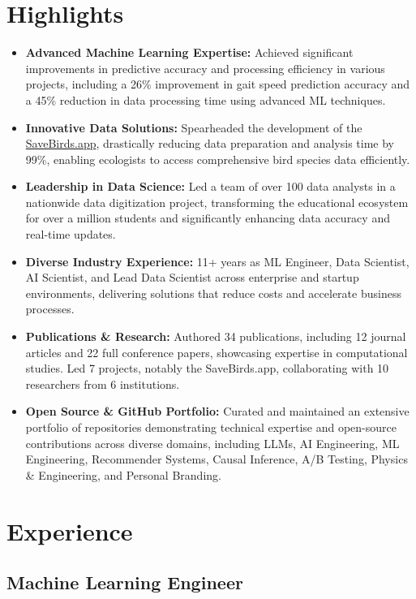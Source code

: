 \documentclass[11pt]{article}
\begin{document}
\section{Highlights}
\begin{itemize}[itemsep=5pt]
	\item \textbf{Advanced Machine Learning Expertise:} Achieved significant improvements in predictive accuracy and processing efficiency in various projects, including a 26\% improvement in gait speed prediction accuracy and a 45\% reduction in data processing time using advanced ML techniques.
	\item \textbf{Innovative Data Solutions:} Spearheaded the development of the \href{https://savebirds.app/}{SaveBirds.app}, drastically reducing data preparation and analysis time by 99\%, enabling ecologists to access comprehensive bird species data efficiently.
	\item \textbf{Leadership in Data Science:} Led a team of over 100 data analysts in a nationwide data digitization project, transforming the educational ecosystem for over a million students and significantly enhancing data accuracy and real-time updates.
	\item \textbf{Diverse Industry Experience:} 11+ years as ML Engineer, Data Scientist, AI Scientist, and Lead Data Scientist across enterprise and startup environments, delivering solutions that reduce costs and accelerate business processes.
	\item \textbf{Publications \& Research:} Authored 34 publications, including 12 journal articles and 22 full conference papers, showcasing expertise in computational studies. Led 7 projects, notably the SaveBirds.app, collaborating with 10 researchers from 6 institutions. 
	\item \textbf{Open Source \& GitHub Portfolio:} Curated and maintained an extensive portfolio of repositories demonstrating technical expertise and open-source contributions across diverse domains, including LLMs, AI Engineering, ML Engineering, Recommender Systems, Causal Inference, A/B Testing, Physics \& Engineering, and Personal Branding.
\end{itemize}

\section{Experience}
\subsection{Machine Learning Engineer}
\end{document}
